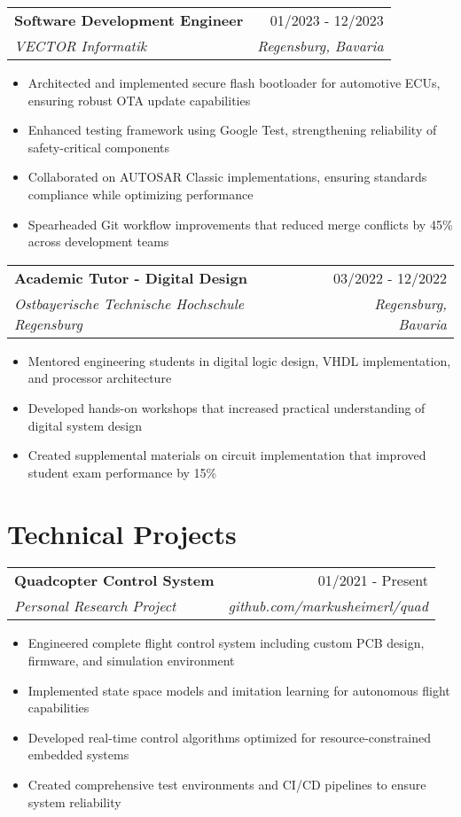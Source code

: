 \documentclass[letterpaper,11pt]{article}
\makeatletter
\newcommand{\entryspace}{\vspace{0.2em}}
\newcommand{\cventry}[4]{
  \begin{tabular*}{\textwidth}{l@{\extracolsep{\fill}}r}
    \textbf{#1} & \textcolor{secondary}{#2} \\
    \textcolor{accent}{\textit{#3}} & \textcolor{secondary}{\textit{#4}} \\
  \end{tabular*}\entryspace
}
\makeatother
\begin{document}
\cventry{Software Development Engineer}{01/2023 - 12/2023}
{VECTOR Informatik}{Regensburg, Bavaria}
\begin{itemize}[leftmargin=*, nosep]
    \item Architected and implemented secure flash bootloader for automotive ECUs, ensuring robust OTA update capabilities
    \item Enhanced testing framework using Google Test, strengthening reliability of safety-critical components
    \item Collaborated on AUTOSAR Classic implementations, ensuring standards compliance while optimizing performance
    \item Spearheaded Git workflow improvements that reduced merge conflicts by 45\% across development teams
\end{itemize}

\cventry{Academic Tutor - Digital Design}{03/2022 - 12/2022}
{Ostbayerische Technische Hochschule Regensburg}{Regensburg, Bavaria}
\begin{itemize}[leftmargin=*, nosep]
    \item Mentored engineering students in digital logic design, VHDL implementation, and processor architecture
    \item Developed hands-on workshops that increased practical understanding of digital system design
    \item Created supplemental materials on circuit implementation that improved student exam performance by 15\%
\end{itemize}

\section{Technical Projects}

\cventry{Quadcopter Control System}{01/2021 - Present}
{Personal Research Project}{github.com/markusheimerl/quad}
\begin{itemize}[leftmargin=*, nosep]
    \item Engineered complete flight control system including custom PCB design, firmware, and simulation environment
    \item Implemented state space models and imitation learning for autonomous flight capabilities
    \item Developed real-time control algorithms optimized for resource-constrained embedded systems
    \item Created comprehensive test environments and CI/CD pipelines to ensure system reliability
\end{itemize}
\end{document}
